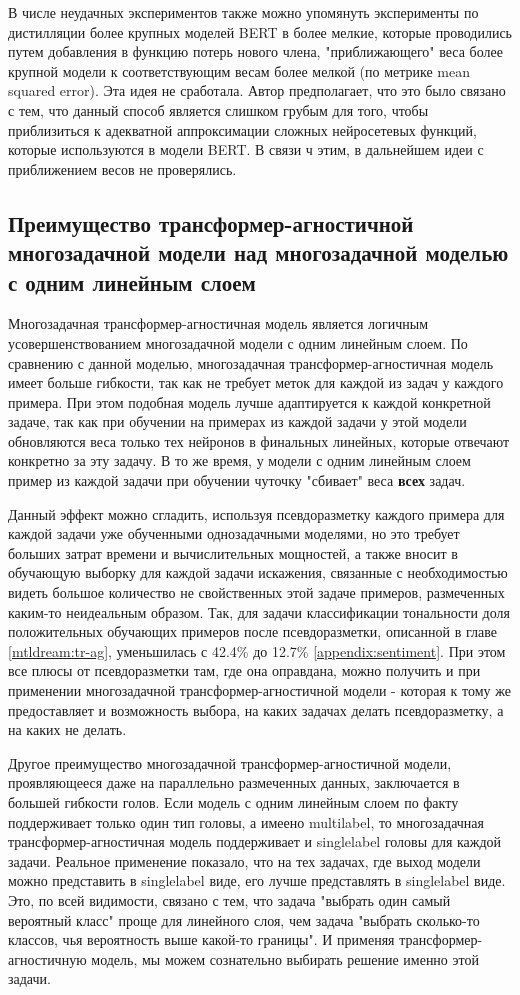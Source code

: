 В числе неудачных экспериментов также можно упомянуть эксперименты по дистилляции более крупных моделей BERT в более мелкие, которые проводились путем добавления в функцию потерь нового члена, "приближающего" веса более крупной модели к соответствующим весам более мелкой (по метрике mean squared error). Эта идея не сработала. Автор предполагает, что это было связано с тем, что данный способ является слишком грубым для того, чтобы приблизиться к адекватной аппроксимации сложных нейросетевых функций, которые используются в модели BERT. В связи ч этим, в дальнейшем идеи с приближением весов не проверялись. 
\subsection{Преимущество трансформер-агностичной многозадачной модели над многозадачной моделью с одним линейным слоем} 
\label{ch:tr-ag:advantages}

Многозадачная трансформер-агностичная модель является логичным усовершенствованием многозадачной модели с одним линейным слоем. По сравнению с данной моделью, многозадачная трансформер-агностичная модель имеет больше гибкости, так как не требует меток для каждой из задач у каждого примера. При этом подобная модель лучше адаптируется к каждой конкретной задаче, так как при обучении на примерах из каждой задачи у этой модели обновляются веса только тех нейронов в финальных линейных, которые отвечают конкретно за эту задачу. В то же время, у модели с одним линейным слоем пример из каждой задачи при обучении чуточку "сбивает" веса \textbf{всех} задач. 

Данный эффект можно сгладить, используя псевдоразметку каждого примера для каждой задачи уже обученными однозадачными моделями, но это требует больших затрат времени и вычислительных мощностей, а также вносит в обучающую выборку для каждой задачи искажения, связанные с необходимостью видеть большое количество не свойственных этой задаче примеров, размеченных каким-то неидеальным образом. Так, для задачи классификации тональности доля положительных обучающих примеров после псевдоразметки, описанной в главе \ref{mtldream:tr-ag}, уменьшилась с 42.4\% до 12.7\% \ref{appendix:sentiment}. При этом все плюсы от псевдоразметки там, где она оправдана, можно получить и при применении многозадачной трансформер-агностичной модели - которая к тому же предоставляет и возможность выбора, на каких задачах делать псевдоразметку, а на каких не делать.

Другое преимущество многозадачной трансформер-агностичной модели, проявляющееся даже на параллельно размеченных данных, заключается в большей гибкости голов. Если модель с одним линейным слоем по факту поддерживает только один тип головы, а имеено multilabel, то многозадачная трансформер-агностичная модель поддерживает и singlelabel головы для каждой задачи. Реальное применение показало, что на тех задачах, где выход модели можно представить в singlelabel виде, его лучше представлять в singlelabel виде. Это, по всей видимости, связано с тем, что задача "выбрать один самый вероятный класс" проще для линейного слоя, чем задача "выбрать сколько-то классов, чья вероятность выше какой-то границы". И применяя трансформер-агностичную модель, мы можем сознательно выбирать решение именно этой задачи.

